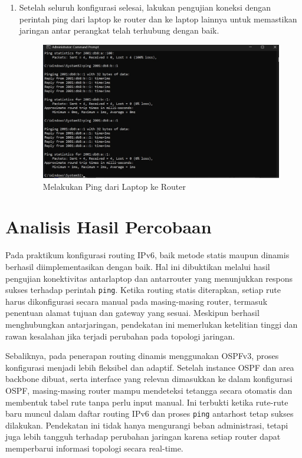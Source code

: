 \begin{enumerate}
    \item Setelah seluruh konfigurasi selesai, lakukan pengujian koneksi dengan perintah ping dari laptop ke router dan ke laptop lainnya untuk memastikan jaringan antar perangkat telah terhubung dengan baik.
    \begin{figure}[H]
        \centering
        \includegraphics[width=0.5\linewidth]{P1/img/11.jpeg}
        \caption{Melakukan Ping dari Laptop ke Router}
        \label{fig:gambar5}
    \end{figure}

  
\end{enumerate}



\section{Analisis Hasil Percobaan}
Pada praktikum konfigurasi routing IPv6, baik metode statis maupun dinamis berhasil diimplementasikan dengan baik. Hal ini dibuktikan melalui hasil pengujian konektivitas antarlaptop dan antarrouter yang menunjukkan respons sukses terhadap perintah \texttt{ping}. Ketika routing statis diterapkan, setiap rute harus dikonfigurasi secara manual pada masing-masing router, termasuk penentuan alamat tujuan dan gateway yang sesuai. Meskipun berhasil menghubungkan antarjaringan, pendekatan ini memerlukan ketelitian tinggi dan rawan kesalahan jika terjadi perubahan pada topologi jaringan.

Sebaliknya, pada penerapan routing dinamis menggunakan OSPFv3, proses konfigurasi menjadi lebih fleksibel dan adaptif. Setelah instance OSPF dan area backbone dibuat, serta interface yang relevan dimasukkan ke dalam konfigurasi OSPF, masing-masing router mampu mendeteksi tetangga secara otomatis dan membentuk tabel rute tanpa perlu input manual. Ini terbukti ketika rute-rute baru muncul dalam daftar routing IPv6 dan proses \texttt{ping} antarhost tetap sukses dilakukan. Pendekatan ini tidak hanya mengurangi beban administrasi, tetapi juga lebih tangguh terhadap perubahan jaringan karena setiap router dapat memperbarui informasi topologi secara real-time.

